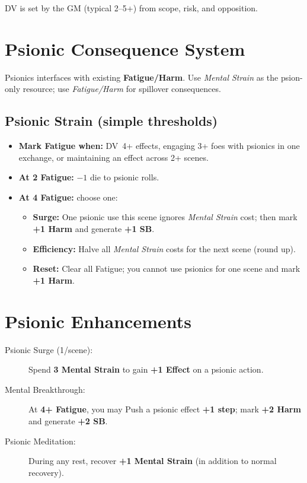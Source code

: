 \documentclass[11pt,twoside]{article}
\begin{document}
DV is set by the GM (typical 2--5+) from scope, risk, and opposition.

\section{Psionic Consequence System}

Psionics interfaces with existing \textbf{Fatigue/Harm}. Use \emph{Mental Strain} as the psion-only resource; use \emph{Fatigue/Harm} for spillover consequences.

\subsection{Psionic Strain (simple thresholds)}
\begin{itemize}[leftmargin=*]
  \item \textbf{Mark Fatigue when:} DV~4+ effects, engaging 3+ foes with psionics in one exchange, or maintaining an effect across 2+ scenes.
  \item \textbf{At 2 Fatigue:} $-1$ die to psionic rolls.
  \item \textbf{At 4 Fatigue:} choose one:
  \begin{itemize}
    \item \textbf{Surge:} One psionic use this scene ignores \emph{Mental Strain} cost; then mark \textbf{+1 Harm} and generate \textbf{+1 SB}.
    \item \textbf{Efficiency:} Halve all \emph{Mental Strain} costs for the next scene (round up).
    \item \textbf{Reset:} Clear all Fatigue; you cannot use psionics for one scene and mark \textbf{+1 Harm}.
  \end{itemize}
\end{itemize}

\section{Psionic Enhancements}
\begin{description}
  \item[Psionic Surge (1/scene):] Spend \textbf{3 Mental Strain} to gain \textbf{+1 Effect} on a psionic action.
  \item[Mental Breakthrough:] At \textbf{4+ Fatigue}, you may Push a psionic effect \textbf{+1 step}; mark \textbf{+2 Harm} and generate \textbf{+2 SB}.
  \item[Psionic Meditation:] During any rest, recover \textbf{+1 Mental Strain} (in addition to normal recovery).
\end{description}
\end{document}

